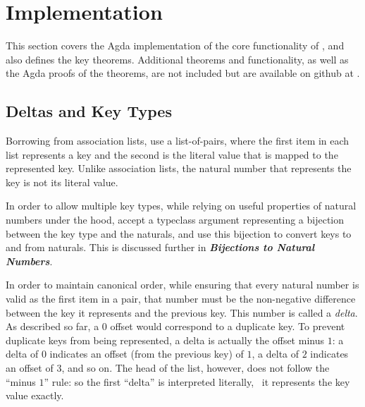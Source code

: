 \section{Implementation}
\label{sec:DD}



This section covers the Agda implementation of the core functionality of \dds, and also defines the key theorems. Additional theorems and functionality, as well as the Agda proofs of the theorems, are not included but are available on github at \citep{github:agda}.

\subsection{Deltas and Key Types}

Borrowing from association lists, \dds{} use a list-of-pairs, where the first item in each list represents a key and the second is the literal value that is mapped to the represented key.
%
Unlike association lists, the natural number that represents the key is not its literal value.

In order to allow multiple key types, while relying on useful properties of natural numbers under the hood, \dds{} accept a typeclass argument representing a bijection
%
between the key type and the naturals, and use this bijection to convert keys to and from naturals. This is discussed further in \emph{\textbf{Bijections to Natural Numbers}}.

In order to maintain canonical order, while ensuring that every natural number is valid as the first item in a pair, that number must be the non-negative difference between the key it represents and the previous key.
%
This number is called a \emph{delta}. %
%
As described so far, a $0$ offset would correspond to a duplicate key.
%
To prevent duplicate keys from being represented, a delta is actually the offset minus $1$: a delta of $0$ indicates an offset (from the previous key) of $1$, a delta of $2$ indicates an offset of $3$, and so on.
%
The head of the list, however, does not follow the ``minus $1$'' rule: so the first ``delta'' is interpreted literally, \ie{}~it represents the key value exactly.

